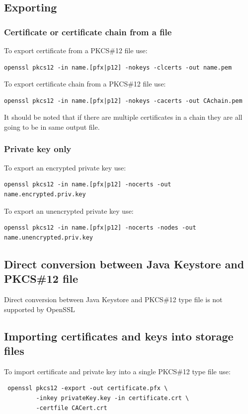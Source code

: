 \documentclass[10pt, a4paper]{report}
\begin{document}
  \subsection{Exporting}
  
    \subsubsection{Certificate or certificate chain from a file}
    To export certificate from a PKCS\#12 file use:
\begin{verbatim}
openssl pkcs12 -in name.[pfx|p12] -nokeys -clcerts -out name.pem
\end{verbatim}

    To export certificate chain from a PKCS\#12 file use:
\begin{verbatim}
openssl pkcs12 -in name.[pfx|p12] -nokeys -cacerts -out CAchain.pem
\end{verbatim}
    It should be noted that if there are multiple certificates in a chain they are all going to be in same output file.

    \subsubsection{Private key only}
    To export an encrypted private key use:
\begin{verbatim}
openssl pkcs12 -in name.[pfx|p12] -nocerts -out name.encrypted.priv.key
\end{verbatim}

    To export an unencrypted private key use:
\begin{verbatim}
openssl pkcs12 -in name.[pfx|p12] -nocerts -nodes -out name.unencrypted.priv.key
\end{verbatim}


  \subsection{Direct conversion between Java Keystore and PKCS\#12 file}
Direct conversion between Java Keystore and PKCS\#12 type file is not supported by OpenSSL 
  \subsection{Importing certificates and keys into storage files}
To import certificate and private key into a single PKCS\#12 type file use:
\begin{verbatim}
 openssl pkcs12 -export -out certificate.pfx \
         -inkey privateKey.key -in certificate.crt \
         -certfile CACert.crt
\end{verbatim}
\end{document}
